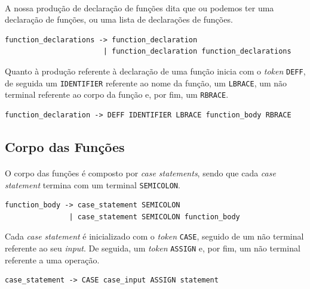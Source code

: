 \documentclass[11pt,a4paper]{report}
\begin{document}
\paragraph*{}
A nossa produção de declaração de funções dita que ou podemos ter uma declaração de funções, ou uma lista de declarações de funções.

\begin{verbatim}
function_declarations -> function_declaration
                       | function_declaration function_declarations
\end{verbatim}

Quanto à produção referente à declaração de uma função inicia com o \textit{token} \texttt{DEFF}, de seguida um \texttt{IDENTIFIER} referente ao nome da função, um \texttt{LBRACE}, um não terminal referente ao corpo da função e, por fim, um \texttt{RBRACE}.

\begin{verbatim}
function_declaration -> DEFF IDENTIFIER LBRACE function_body RBRACE
\end{verbatim}

\subsection{Corpo das Funções}
\paragraph*{}
O corpo das funções é composto por \textit{case statements}, sendo que cada \textit{case statement} termina com um terminal \texttt{SEMICOLON}.

\begin{verbatim}
function_body -> case_statement SEMICOLON
               | case_statement SEMICOLON function_body
\end{verbatim}

Cada \textit{case statement} é inicializado com o \textit{token} \texttt{CASE}, seguido de um não terminal referente ao seu \textit{input}. De seguida, um \textit{token} \texttt{ASSIGN} e, por fim, um não terminal referente a uma operação.

\begin{verbatim}
case_statement -> CASE case_input ASSIGN statement
\end{verbatim}
\end{document}
